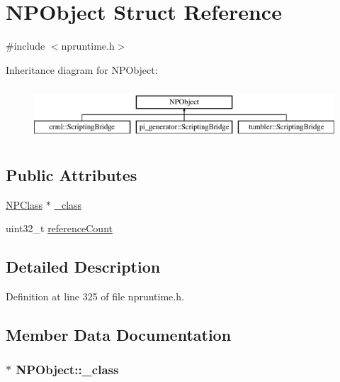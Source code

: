 \hypertarget{struct_n_p_object}{
\section{NPObject Struct Reference}
\label{struct_n_p_object}
}


{\ttfamily \#include $<$npruntime.h$>$}

Inheritance diagram for NPObject:\begin{figure}[H]
\begin{center}
\leavevmode
\includegraphics[height=2cm]{struct_n_p_object}
\end{center}
\end{figure}
\subsection*{Public Attributes}
\begin{DoxyCompactItemize}
\item 
\hyperlink{struct_n_p_class}{NPClass} $\ast$ \hyperlink{struct_n_p_object_a2c62da9b2fbf0399ee207289c326541b}{\_\-class}
\item 
uint32\_\-t \hyperlink{struct_n_p_object_a0f9e1d517ff19eebbdb732487a99bae2}{referenceCount}
\end{DoxyCompactItemize}


\subsection{Detailed Description}


Definition at line 325 of file npruntime.h.



\subsection{Member Data Documentation}
\hypertarget{struct_n_p_object_a2c62da9b2fbf0399ee207289c326541b}{
\subsubsection[{\_\-class}]{$\ast$ {\bf NPObject::\_\-class}}}
\label{struct_n_p_object_a2c62da9b2fbf0399ee207289c326541b}


